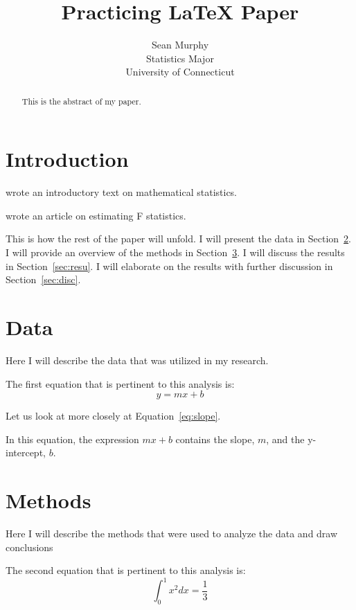 \documentclass[12pt]{article}
\title{Practicing LaTeX Paper}
\author{Sean Murphy\\
Statistics Major\\
University of Connecticut}
\begin{document}
\maketitle

\begin{abstract}
This is the abstract of my paper. 
\end{abstract}

\section{Introduction}
\label{sec:intro}

\lipsum[1]

\citet{larsen2005introduction} wrote an introductory text on mathematical statistics.  

\citep{weir2002estimating} wrote an article on estimating F statistics.  

This is how the rest of the paper will unfold. 
I will present the data in Section~\ref{sec:data}. 
I will provide an overview of the methods in Section~\ref{sec:math}. 
I will discuss the results in Section~\ref{sec:resu}. 
I will elaborate on the results with further discussion in Section~\ref{sec:disc}.

\section{Data}
\label{sec:data}

Here I will describe the data that was utilized in my research.  

The first equation that is pertinent to this analysis is:
\begin{equation}
    \label{eq:slope}
    y = mx + b
\end{equation}

Let us look at more closely at Equation~\eqref{eq:slope}.

In this equation, the expression $mx + b$ contains the slope, $m$, and the y-intercept, $b$.


\section{Methods}
\label{sec:math}

Here I will describe the methods that were used to analyze the data and draw conclusions

The second equation that is pertinent to this analysis is:
\begin{equation}
    \label{eq:int}
    \int_0^1x^2dx=\frac{1}{3}
\end{equation}
\end{document}

